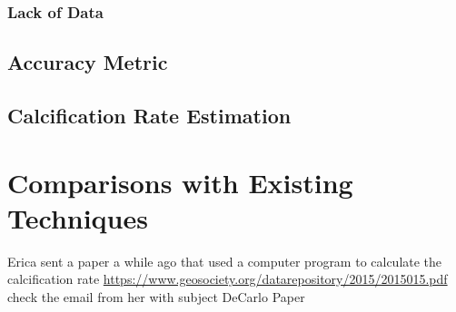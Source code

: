 \subsubsection{Lack of Data}

\subsection{Accuracy Metric}

\subsection{Calcification Rate Estimation}

\section{Comparisons with Existing Techniques}

Erica sent a paper a while ago that used a computer program to calculate the calcification rate  \url{https://www.geosociety.org/datarepository/2015/2015015.pdf} check the email from her with subject DeCarlo Paper




